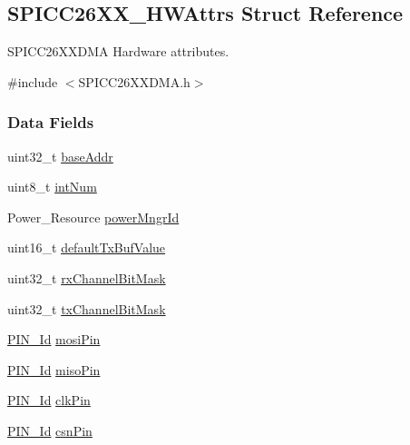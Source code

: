 \subsection{S\+P\+I\+C\+C26\+X\+X\+\_\+\+H\+W\+Attrs Struct Reference}
\label{struct_s_p_i_c_c26_x_x___h_w_attrs}


S\+P\+I\+C\+C26\+X\+X\+D\+M\+A Hardware attributes.  




{\ttfamily \#include $<$S\+P\+I\+C\+C26\+X\+X\+D\+M\+A.\+h$>$}

\subsubsection*{Data Fields}
\begin{DoxyCompactItemize}
\item 
uint32\+\_\+t \hyperlink{struct_s_p_i_c_c26_x_x___h_w_attrs_a7e7cb3e32890a0b812a4c0bf989506a1}{base\+Addr}
\item 
uint8\+\_\+t \hyperlink{struct_s_p_i_c_c26_x_x___h_w_attrs_a44bca6f2ec5dbdd3b2b33421150763f6}{int\+Num}
\item 
Power\+\_\+\+Resource \hyperlink{struct_s_p_i_c_c26_x_x___h_w_attrs_a0deb3d84474b2ffd1400b12077045e61}{power\+Mngr\+Id}
\item 
uint16\+\_\+t \hyperlink{struct_s_p_i_c_c26_x_x___h_w_attrs_ac0471da0f3145bd1550e2ba4df579e96}{default\+Tx\+Buf\+Value}
\item 
uint32\+\_\+t \hyperlink{struct_s_p_i_c_c26_x_x___h_w_attrs_aabed07f4796ecf513a53a8b750347d18}{rx\+Channel\+Bit\+Mask}
\item 
uint32\+\_\+t \hyperlink{struct_s_p_i_c_c26_x_x___h_w_attrs_a373e75c95a12324d6b6e7ad99aa50630}{tx\+Channel\+Bit\+Mask}
\item 
\hyperlink{_p_i_n_8h_a9ae8197f460bb76ea09a84f47d09921f}{P\+I\+N\+\_\+\+Id} \hyperlink{struct_s_p_i_c_c26_x_x___h_w_attrs_ad92b8c26ba67fbb59433d8ba92e66e6e}{mosi\+Pin}
\item 
\hyperlink{_p_i_n_8h_a9ae8197f460bb76ea09a84f47d09921f}{P\+I\+N\+\_\+\+Id} \hyperlink{struct_s_p_i_c_c26_x_x___h_w_attrs_a1da19170e674ae1e4e987dae134ccaef}{miso\+Pin}
\item 
\hyperlink{_p_i_n_8h_a9ae8197f460bb76ea09a84f47d09921f}{P\+I\+N\+\_\+\+Id} \hyperlink{struct_s_p_i_c_c26_x_x___h_w_attrs_ab7cf65653337166fab5ddf80af15de8b}{clk\+Pin}
\item 
\hyperlink{_p_i_n_8h_a9ae8197f460bb76ea09a84f47d09921f}{P\+I\+N\+\_\+\+Id} \hyperlink{struct_s_p_i_c_c26_x_x___h_w_attrs_a95e4b9fb826bd28501c823e42e7d4ba5}{csn\+Pin}
\end{DoxyCompactItemize}


